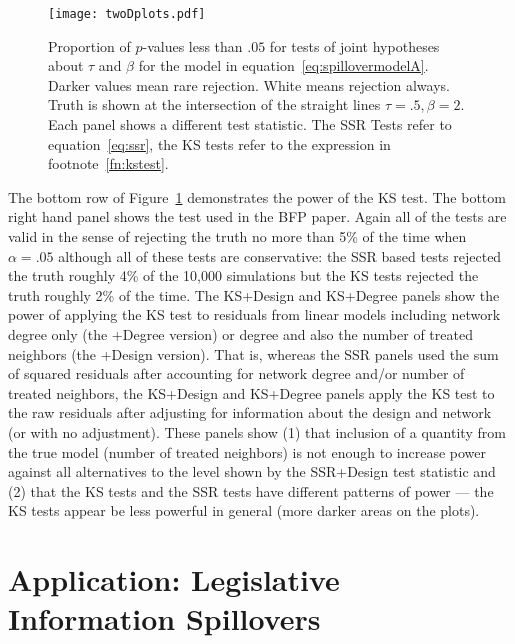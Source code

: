 \begin{figure}[h!] \centering
  \texttt{[image: twoDplots.pdf]} \caption{Proportion of
    $p$-values less than $.05$ for tests of joint hypotheses about $\tau$ and
    $\beta$ for the model in equation~\ref{eq:spillovermodelA}. Darker values
    mean rare rejection. White means rejection always. Truth is shown at the
    intersection of the straight lines  $\tau=.5, \beta=2$. Each panel shows a
    different test statistic. The SSR Tests refer to equation~\ref{eq:ssr},
    the KS tests refer to the expression in
    footnote~\ref{fn:kstest}.}\label{fig:twoD}
\end{figure}

The bottom row of Figure~\ref{fig:twoD} demonstrates the power of the KS test.
The bottom right hand panel shows the test used in the BFP paper. Again all of the tests
are valid in the sense of rejecting the truth no more than 5\% of the time
when $\alpha=.05$ although all of these tests are conservative: the SSR based
tests rejected the truth roughly 4\% of the 10,000 simulations but the KS
tests rejected the truth roughly 2\% of the time.  The KS+Design and KS+Degree
panels show the power of applying the KS test to residuals from linear models
including network degree only (the +Degree version) or degree and also the
number of treated neighbors (the +Design version). That is, whereas the SSR
panels used the sum of squared residuals after accounting for network degree
and/or number of treated neighbors, the KS+Design and KS+Degree panels apply
the KS test to the raw residuals after adjusting for information about the
design and network (or with no adjustment). These panels show (1) that
inclusion of a quantity from the true model (number of treated neighbors) is
not enough to increase power against all alternatives to the level shown by
the SSR+Design test statistic and (2) that the KS tests and the SSR tests have
different patterns of power --- the KS tests appear be less powerful in general
(more darker areas on the plots).

\section{Application: Legislative Information Spillovers}


